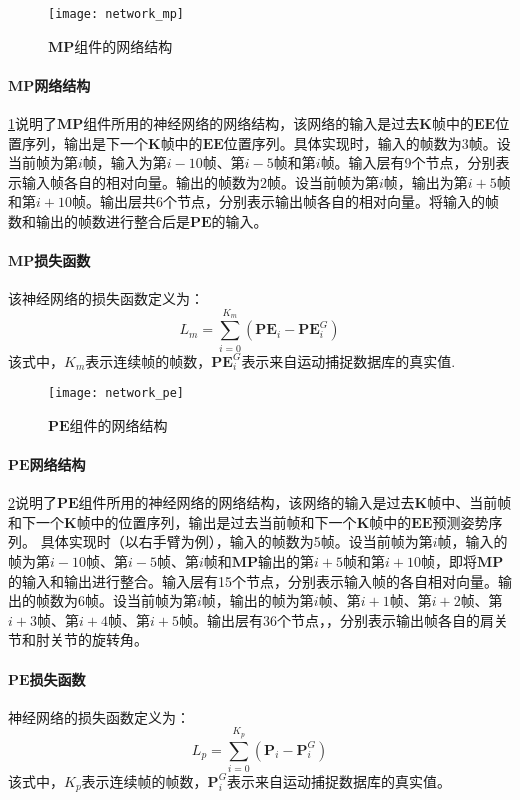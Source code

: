 \begin{figure}[!h]
	\centering
	\texttt{[image: network\_mp]}
	\caption[]{\label{fig:network_mp}
	$\mathbf{MP}$组件的网络结构
	}
\end{figure}
\paragraph{$\mathbf{MP}$网络结构}\cref{fig:network_mp}说明了$\mathbf{MP}$组件所用的神经网络的网络结构，该网络的输入是过去$\mathbf{K}$帧中的$\mathbf{EE}$位置序列，输出是下一个$\mathbf{K}$帧中的$\mathbf{EE}$位置序列。具体实现时，输入的帧数为$3$帧。设当前帧为第$i$帧，输入为第$i-10$帧、第$i-5$帧和第$i$帧。输入层有9个节点，分别表示输入帧各自的相对向量。输出的帧数为$2$帧。设当前帧为第$i$帧，输出为第$i+5$帧和第$i+10$帧。输出层共6个节点，分别表示输出帧各自的相对向量。将输入的帧数和输出的帧数进行整合后是$\mathbf{PE}$的输入。
\paragraph{$\mathbf{MP}$损失函数}

该神经网络的损失函数定义为：
\begin{equation}
L_m = \sum_{i=0}^{K_m} (\mathbf{PE}_i - \mathbf{PE}_i^G)
\end{equation}
该式中，$K_m$表示连续帧的帧数，$\mathbf{PE}_i^G$表示来自运动捕捉数据库的真实值.

\begin{figure}[!h]
	\centering
	\texttt{[image: network\_pe]}
	\caption[]{\label{fig:network_pe}
	$\mathbf{PE}$组件的网络结构
	}
\end{figure}

\paragraph{$\mathbf{PE}$网络结构}
\cref{fig:network_pe}说明了$\mathbf{PE}$组件所用的神经网络的网络结构，该网络的输入是过去$\mathbf{K}$帧中、当前帧和下一个$\mathbf{K}$帧中的位置序列，输出是过去当前帧和下一个$\mathbf{K}$帧中的$\mathbf{EE}$预测姿势序列。 具体实现时（以右手臂为例），输入的帧数为5帧。设当前帧为第$i$帧，输入的帧为第$i-10$帧、第$i-5$帧、第$i$帧和$\mathbf{MP}$输出的第$i+5$帧和第$i+10$帧，即将$\mathbf{MP}$
的输入和输出进行整合。输入层有15个节点，分别表示输入帧的各自相对向量。输出的帧数为$6$帧。设当前帧为第$i$帧，输出的帧为第$i$帧、第$i+1$帧、第$i+2$帧、第$i+3$帧、第$i+4$帧、第$i+5$帧。输出层有36个节点，，分别表示输出帧各自的肩关节和肘关节的旋转角。
\paragraph{$\mathbf{PE}$损失函数}
神经网络的损失函数定义为：
\begin{equation}
L_p = \sum_{i=0}^{K_p} (\mathbf{P}_i - \mathbf{P}_i^G)
\end{equation}
该式中，$K_p$表示连续帧的帧数，$\mathbf{P}_i^G$表示来自运动捕捉数据库的真实值。

